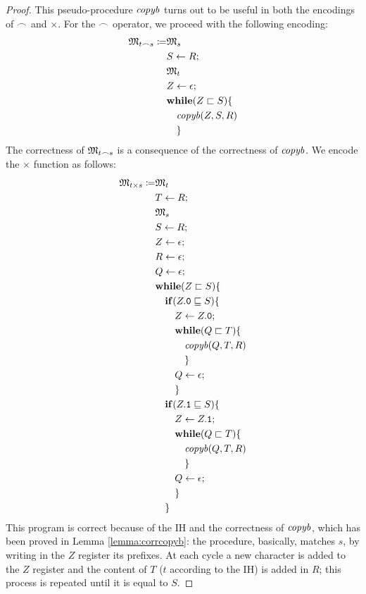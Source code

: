 \begin{proof}
This pseudo-procedure $\mathit{copyb}$ turns out to be useful in both the encodings of $\frown$ and $\times$. For the $\frown$ operator, we proceed with the following encoding:
%
\begin{align*}
\mathfrak M_{t \frown s}\coloneqq &\mathfrak M_s\\
& S \leftarrow R;\\
& \mathfrak M_t\\
& Z \leftarrow \epsilon; \\
& \mathbf{while}(Z \sqsubset S)\{\\
& \quad \mathit{copyb}(Z, S, R)\\
& \quad \}
\end{align*}
%
\noindent
The correctness of $\mathfrak M_{t \frown s}$ is a consequence of the correctness of $\mathit{copyb}$.
%
We encode the $\times$ function as follows:
\begin{align*}
\mathfrak M_{t \times s}\coloneqq &
\mathfrak M_{t}\\
& T \leftarrow R;\\
& \mathfrak M_{s}\\
& S \leftarrow R;\\
& Z \leftarrow \epsilon;\\
& R \leftarrow \epsilon;\\
& Q \leftarrow \epsilon;\\
& \mathbf{while}(Z \sqsubset S)\{ \\
& \quad \mathbf{if}(Z.\mathtt{0} \sqsubseteq S)\{\\
& \quad \quad Z \leftarrow Z.\mathtt{0};\\
& \quad \quad \mathbf{while}(Q \sqsubset T)\{\\
& \quad \quad \quad \mathit{copyb}(Q, T, R)\\
& \quad \quad \quad \}\\
& \quad \quad Q \leftarrow \epsilon;\\
& \quad \quad \}\\
& \quad \mathbf{if}(Z.\mathtt{1} \sqsubseteq S)\{\\
& \quad \quad Z \leftarrow Z.\mathtt{1};\\
& \quad \quad \mathbf{while}(Q \sqsubset T)\{\\
& \quad \quad \quad \mathit{copyb}(Q, T, R)\\
& \quad \quad \quad \}\\
& \quad \quad Q \leftarrow \epsilon;\\
& \quad \quad \}\\
& \quad \}
\end{align*}
\noindent
This program is correct because of the IH
and the correctness of $\mathit{copyb}$, which has been
proved in Lemma \ref{lemma:corrcopyb}: the procedure, basically, matches $s$,
by writing in the $Z$ register its prefixes. At each cycle
a new character is added to the $Z$ register and
the content of $T$ ($t$ according to the IH) is added in $R$;
this process is repeated until it is equal to $S$.
\end{proof}

